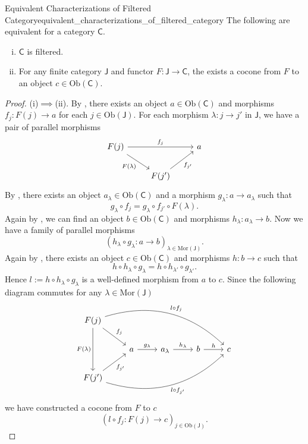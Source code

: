 \begin{proposition}{Equivalent Characterizations of Filtered Category}{equivalent_characterizations_of_filtered_category}
    The following are equivalent for a category $\mathsf{C}$.
    \begin{enumerate}[(i)]
        \item $\mathsf{C}$ is filtered.
        \item For any finite category $\mathsf{J}$ and functor $F:\mathsf{J}\to \mathsf{C}$, the exists a cocone from $F$ to an object $c\in \mathrm{Ob}(\mathsf{C})$.
    \end{enumerate}
\end{proposition}
\begin{proof}
    (i)$\implies$(ii). By , there exists an object $a\in \mathrm{Ob}(\mathsf{C})$ and morphisms $f_j:F(j)\to a$ for each $j\in \mathrm{Ob}(\mathsf{J})$. For each morphism $\lambda:j\to j'$ in $\mathsf{J}$, we have a pair of parallel morphisms
    \[
    \begin{tikzcd}
        F(j) \arrow[rr, "f_j"] \arrow[rd, "F(\lambda)"'] &                             & a \\
                                                         & F(j') \arrow[ru, "f_{j'}"'] &  
    \end{tikzcd}
    \]
    By , there exists an object $a_{\lambda}\in \mathrm{Ob}(\mathsf{C})$ and a morphism $g_\lambda:a\to a_{\lambda}$ such that 
    \[
    g_\lambda\circ f_j= g_\lambda\circ f_{j'}\circ F(\lambda).
    \]
    Again by , we can find an object $b\in \mathrm{Ob}(\mathsf{C})$ and morphisms $h_\lambda:a_{\lambda}\to b$. Now we have a family of parallel morphisms
    \[
    \left(h_\lambda\circ g_\lambda : a\longrightarrow b\right)_{\lambda\in\mathrm{Mor}\left(\mathsf{J}\right)}.
    \]
    Again by , there exists an object $c\in \mathrm{Ob}(\mathsf{C})$ and morphisms $h:b\to c$ such that
    \[
    h\circ h_\lambda\circ g_\lambda=h\circ h_{\lambda'}\circ g_{\lambda'}.
    \]
    Hence $l:=h\circ h_\lambda\circ g_\lambda$ is a well-defined morphism from $a$ to $c$. Since the following diagram commutes for any $\lambda\in\mathrm{Mor}\left(\mathsf{J}\right)$
    \[
        \begin{tikzcd}
            F(j) \arrow[rd, "f_j"] \arrow[dd, "F(\lambda)"'] \arrow[rrrrd, "l\circ f_j", bend left] &                          &                                  &                  &   \\
                                                                                                    & a \arrow[r, "g_\lambda"] & a_\lambda \arrow[r, "h_\lambda"] & b \arrow[r, "h"] & c \\
            F(j') \arrow[ru, "f_{j'}"'] \arrow[rrrru, "l\circ f_{j'}"', bend right]                 &                          &                                  &                  &  
        \end{tikzcd}
    \]
    we have constructed a cocone from $F$ to $c$
    \[
    \left( l\circ f_j:F(j)\longrightarrow c\right)_{j\in \mathrm{Ob}(\mathsf{J})}.
    \]
\end{proof}

